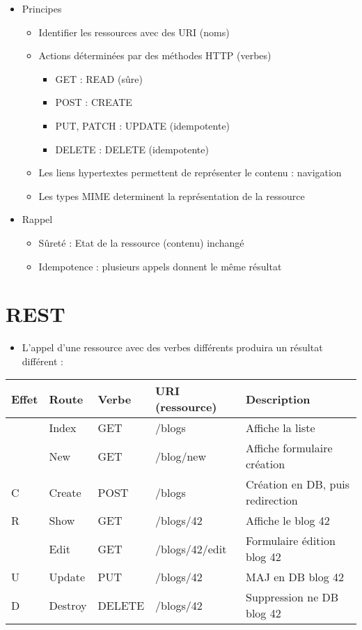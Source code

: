 \begin{itemize}
\tightlist
\item
  Principes

  \begin{itemize}
  \tightlist
  \item
    Identifier les ressources avec des URI (noms)
  \item
    Actions déterminées par des méthodes HTTP (verbes)

    \begin{itemize}
    \tightlist
    \item
      GET : READ (sûre)
    \item
      POST : CREATE
    \item
      PUT, PATCH : UPDATE (idempotente)
    \item
      DELETE : DELETE (idempotente)
    \end{itemize}
  \item
    Les liens hypertextes permettent de représenter le contenu :
    navigation
  \item
    Les types MIME determinent la représentation de la ressource
  \end{itemize}
\item
  Rappel

  \begin{itemize}
  \tightlist
  \item
    Sûreté : Etat de la ressource (contenu) inchangé
  \item
    Idempotence : plusieurs appels donnent le même résultat
  \end{itemize}
\end{itemize}

\hypertarget{rest-1}{%
\section{REST}\label{rest-1}}

\begin{itemize}
\tightlist
\item
  L'appel d'une ressource avec des verbes différents produira un
  résultat différent :
\end{itemize}

\begin{longtable}[]{@{}lllll@{}}
\toprule
Effet & Route & Verbe & URI (ressource) & Description\tabularnewline
\midrule
\endhead
& Index & GET & /blogs & Affiche la liste\tabularnewline
& New & GET & /blog/new & Affiche formulaire création\tabularnewline
C & Create & POST & /blogs & Création en DB, puis
redirection\tabularnewline
R & Show & GET & /blogs/42 & Affiche le blog 42\tabularnewline
& Edit & GET & /blogs/42/edit & Formulaire édition blog
42\tabularnewline
U & Update & PUT & /blogs/42 & MAJ en DB blog 42\tabularnewline
D & Destroy & DELETE & /blogs/42 & Suppression ne DB blog
42\tabularnewline
\bottomrule
\end{longtable}

